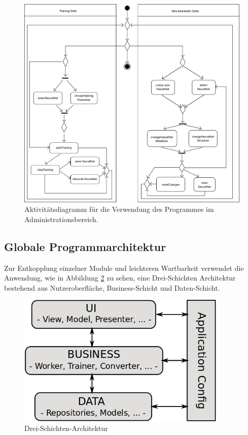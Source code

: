 \begin{figure}[H]
\begin{center}
\includegraphics[width=\textwidth]{Abbildungen/UML/jan/trainingConfigAD.png}
\caption{Aktivitätsdiagramm für die Verwendung des Programmes im Administrationsbereich.}
\label{fig_trainingConfigAD}
\end{center}
\end{figure}

\subsection{Globale Programmarchitektur}

Zur Entkopplung einzelner Module und leichteren Wartbarkeit verwendet die Anwendung, wie in Abbildung \ref{Drei-Schichten-Architektur} zu sehen, eine Drei-Schichten Architektur bestehend aus	 Nutzeroberfläche, Business-Schicht und Daten-Schicht.
\begin{figure}[H]
\begin{center}
\includegraphics[width=10cm]{Abbildungen/UML/jan/SchichtenModell.png}
\caption{Drei-Schichten-Architektur} 
\label{Drei-Schichten-Architektur}
\end{center}
\end{figure}

